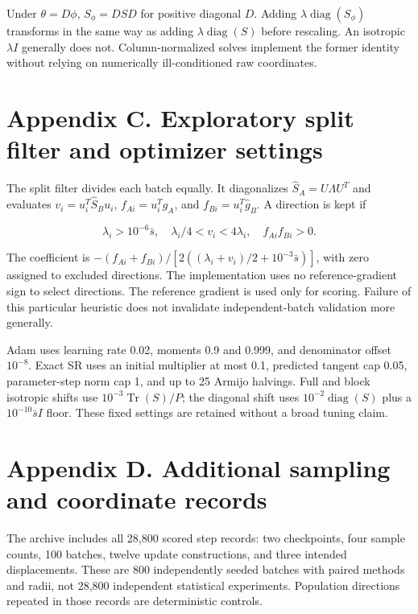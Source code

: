 \documentclass[
  11pt,
  a4paper,
]{article}
\begin{document}
Under \(\theta=D\phi\), \(S_\phi=DSD\) for positive diagonal \(D\).
Adding \(\lambda\operatorname{diag}(S_\phi)\) transforms in the same way
as adding \(\lambda\operatorname{diag}(S)\) before rescaling. An
isotropic \(\lambda I\) generally does not. Column-normalized solves
implement the former identity without relying on numerically
ill-conditioned raw coordinates.

\hypertarget{appendix-c.-exploratory-split-filter-and-optimizer-settings}{%
\section{Appendix C. Exploratory split filter and optimizer
settings}\label{appendix-c.-exploratory-split-filter-and-optimizer-settings}}

The split filter divides each batch equally. It diagonalizes
\(\widehat S_A=U\Lambda U^T\) and evaluates
\(v_i=u_i^T\widehat S_Bu_i\), \(f_{Ai}=u_i^T\widehat g_A\), and
\(f_{Bi}=u_i^T\widehat g_B\). A direction is kept if

\[\lambda_i>10^{-6}\bar s,\quad \lambda_i/4<v_i<4\lambda_i,\quad f_{Ai}f_{Bi}>0.\]

The coefficient is
\(-(f_{Ai}+f_{Bi})/[2((\lambda_i+v_i)/2+10^{-3}\bar s)]\), with zero
assigned to excluded directions. The implementation uses no
reference-gradient sign to select directions. The reference gradient is
used only for scoring. Failure of this particular heuristic does not
invalidate independent-batch validation more generally.

Adam uses learning rate 0.02, moments 0.9 and 0.999, and denominator
offset \(10^{-8}\). Exact SR uses an initial multiplier at most 0.1,
predicted tangent cap 0.05, parameter-step norm cap 1, and up to 25
Armijo halvings. Full and block isotropic shifts use
\(10^{-3}\operatorname{Tr}(S)/P\); the diagonal shift uses
\(10^{-2}\operatorname{diag}(S)\) plus a \(10^{-10}\bar s I\) floor.
These fixed settings are retained without a broad tuning claim.

\hypertarget{appendix-d.-additional-sampling-and-coordinate-records}{%
\section{Appendix D. Additional sampling and coordinate
records}\label{appendix-d.-additional-sampling-and-coordinate-records}}

The archive includes all 28,800 scored step records: two checkpoints,
four sample counts, 100 batches, twelve update constructions, and three
intended displacements. These are 800 independently seeded batches with
paired methods and radii, not 28,800 independent statistical
experiments. Population directions repeated in those records are
deterministic controls.
\end{document}
